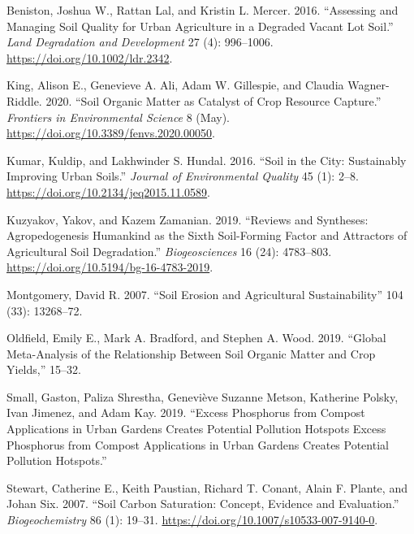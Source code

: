 \documentclass[
]{article}
\newlength{\cslhangindent}
\newlength{\cslentryspacingunit} %
\newenvironment{CSLReferences}[2] %
 {%
  \setlength{\parindent}{0pt}
  \ifodd #1
  \let\oldpar\par
  \def\par{\hangindent=\cslhangindent\oldpar}
  \fi
  \setlength{\parskip}{#2\cslentryspacingunit}
 }%
 {}
\begin{document}
\hypertarget{refs}{}
\begin{CSLReferences}{1}{0}
\leavevmode{}%
Beniston, Joshua W., Rattan Lal, and Kristin L. Mercer. 2016. {``Assessing and {Managing Soil Quality} for {Urban Agriculture} in a {Degraded Vacant Lot Soil}.''} \emph{Land Degradation and Development} 27 (4): 996--1006. \url{https://doi.org/10.1002/ldr.2342}.

\leavevmode{}%
King, Alison E., Genevieve A. Ali, Adam W. Gillespie, and Claudia Wagner-Riddle. 2020. {``Soil {Organic Matter} as {Catalyst} of {Crop Resource Capture}.''} \emph{Frontiers in Environmental Science} 8 (May). \url{https://doi.org/10.3389/fenvs.2020.00050}.

\leavevmode{}%
Kumar, Kuldip, and Lakhwinder S. Hundal. 2016. {``Soil in the {City}: {Sustainably Improving Urban Soils}.''} \emph{Journal of Environmental Quality} 45 (1): 2--8. \url{https://doi.org/10.2134/jeq2015.11.0589}.

\leavevmode{}%
Kuzyakov, Yakov, and Kazem Zamanian. 2019. {``Reviews and Syntheses: {Agropedogenesis} \textendash{} Humankind as the Sixth Soil-Forming Factor and Attractors of Agricultural Soil Degradation.''} \emph{Biogeosciences} 16 (24): 4783--803. \url{https://doi.org/10.5194/bg-16-4783-2019}.

\leavevmode{}%
Montgomery, David R. 2007. {``Soil Erosion and Agricultural Sustainability''} 104 (33): 13268--72.

\leavevmode{}%
Oldfield, Emily E., Mark A. Bradford, and Stephen A. Wood. 2019. {``Global Meta-Analysis of the Relationship Between Soil Organic Matter and Crop Yields,''} 15--32.

\leavevmode{}%
Small, Gaston, Paliza Shrestha, Geneviève Suzanne Metson, Katherine Polsky, Ivan Jimenez, and Adam Kay. 2019. {``Excess Phosphorus from Compost Applications in Urban Gardens Creates Potential Pollution Hotspots {Excess} Phosphorus from Compost Applications in Urban Gardens Creates Potential Pollution Hotspots.''}

\leavevmode{}%
Stewart, Catherine E., Keith Paustian, Richard T. Conant, Alain F. Plante, and Johan Six. 2007. {``Soil Carbon Saturation: Concept, Evidence and Evaluation.''} \emph{Biogeochemistry} 86 (1): 19--31. \url{https://doi.org/10.1007/s10533-007-9140-0}.

\end{CSLReferences}
\end{document}

